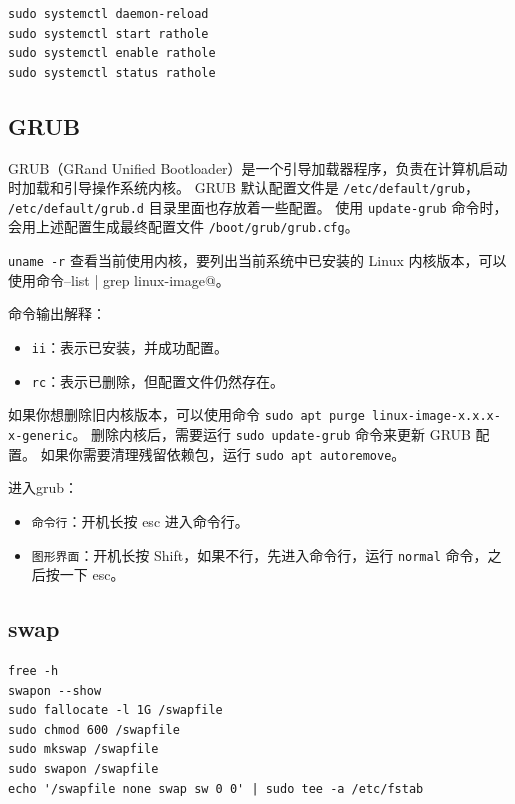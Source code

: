 \begin{code}[title=cron 任务格式]
	\begin{verbatim}
sudo systemctl daemon-reload
sudo systemctl start rathole
sudo systemctl enable rathole
sudo systemctl status rathole
    \end{verbatim}
\end{code}

\subsection{GRUB}
GRUB（GRand Unified Bootloader）是一个引导加载器程序，负责在计算机启动时加载和引导操作系统内核。
GRUB 默认配置文件是 \texttt{/etc/default/grub}， \texttt{/etc/default/grub.d} 目录里面也存放着一些配置。
使用 \verb|update-grub| 命令时，会用上述配置生成最终配置文件 \texttt{/boot/grub/grub.cfg}。

\verb|uname -r| 查看当前使用内核，要列出当前系统中已安装的 Linux 内核版本，可以使用命令\verb@dpkg --list | grep linux-image@。

命令输出解释：
\begin{itemize}
    \item \texttt{ii}：表示已安装，并成功配置。
    \item \texttt{rc}：表示已删除，但配置文件仍然存在。
\end{itemize}

如果你想删除旧内核版本，可以使用命令 \verb|sudo apt purge linux-image-x.x.x-x-generic|。
删除内核后，需要运行 \verb|sudo update-grub| 命令来更新 GRUB 配置。
如果你需要清理残留依赖包，运行 \verb|sudo apt autoremove|。

进入grub：
\begin{itemize}
	\item \texttt{命令行}：开机长按 esc 进入命令行。
	\item \texttt{图形界面}：开机长按 Shift，如果不行，先进入命令行，运行 \verb|normal| 命令，之后按一下 esc。
\end{itemize}

\subsection{swap}

\begin{code}[title=systemd 服务配置文件示例]
	\begin{verbatim}
free -h
swapon --show
sudo fallocate -l 1G /swapfile
sudo chmod 600 /swapfile
sudo mkswap /swapfile
sudo swapon /swapfile
echo '/swapfile none swap sw 0 0' | sudo tee -a /etc/fstab
    \end{verbatim}
\end{code}